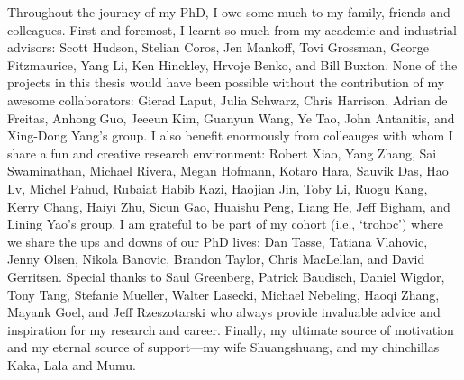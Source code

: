\documentclass[12pt]{cmuthesis}
\begin{document}
\begin{acknowledgments}
Throughout the journey of my PhD, I owe some much to my family, friends and colleagues. First and foremost, I learnt so much from my academic and industrial advisors: Scott Hudson, Stelian Coros, Jen Mankoff, Tovi Grossman, George Fitzmaurice, Yang Li, Ken Hinckley, Hrvoje Benko, and Bill Buxton.
None of the projects in this thesis would have been possible without the contribution of my awesome collaborators: Gierad Laput, Julia Schwarz, Chris Harrison, Adrian de Freitas, Anhong Guo, Jeeeun Kim, Guanyun Wang, Ye Tao, John Antanitis, and Xing-Dong Yang's group.
I also benefit enormously from colleauges with whom I share a fun and creative research environment: Robert Xiao, Yang Zhang, Sai Swaminathan, Michael Rivera, Megan Hofmann, Kotaro Hara, Sauvik Das, Hao Lv, Michel Pahud, Rubaiat Habib Kazi, Haojian Jin, Toby Li, Ruogu Kang, Kerry Chang, Haiyi Zhu, Sicun Gao, Huaishu Peng, Liang He, Jeff Bigham, and Lining Yao's group.
I am grateful to be part of my cohort (i.e., `trohoc') where we share the ups and downs of our PhD lives: Dan Tasse, Tatiana Vlahovic, Jenny Olsen, Nikola Banovic, Brandon Taylor, Chris MacLellan, and David Gerritsen.
Special thanks to Saul Greenberg, Patrick Baudisch, Daniel Wigdor, Tony Tang, Stefanie Mueller, Walter Lasecki, Michael Nebeling, Haoqi Zhang, Mayank Goel, and Jeff Rzeszotarski who always provide invaluable advice and inspiration for my research and career.
Finally, my ultimate source of motivation and my eternal source of support---my wife Shuangshuang, and my chinchillas Kaka, Lala and Mumu.
\end{acknowledgments}


\tableofcontents
\listoffigures
\listoftables

\mainmatter


%
%
%
%
%
\end{document}
